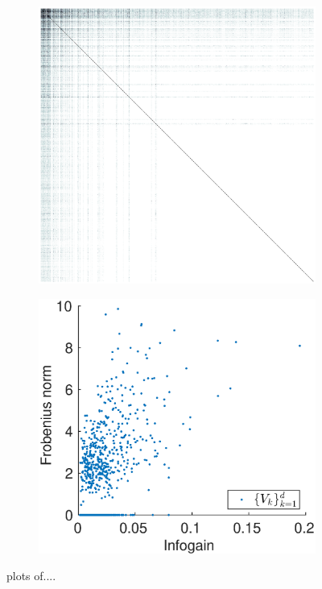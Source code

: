 \documentclass{article}
\begin{document}
\begin{figure}
\begin{subfigure}{.5\textwidth}
  \centering
  \includegraphics[width=1\linewidth]{sparse_W_visualization}
  \caption{}
  \label{fig:sfig1}
\end{subfigure}%
\begin{subfigure}{.5\textwidth}
  \centering
  \includegraphics[width=1\linewidth]{V_features_vs_infogain}
  \caption{}
  \label{fig:sfig2}
\end{subfigure}
\caption{plots of....}
\label{fig:fig}
\end{figure}
\end{document}
